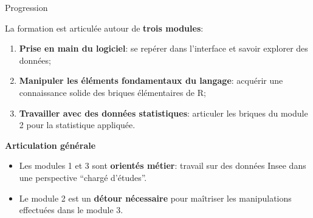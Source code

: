 \documentclass[12pt,ignorenonframetext,]{beamer}
\providecommand{\tightlist}{%
  \setlength{\itemsep}{0pt}\setlength{\parskip}{0pt}}
\newcommand{\strong}[1]{\textbf{\textcolor{redInsee}{#1}}}
\begin{document}
\begin{frame}{Progression}
\protect\hypertarget{progression}{}

La formation est articulée autour de \textbf{trois modules}:

\begin{enumerate}
[1.]
\item
  \pause \textbf{Prise en main du logiciel}: se repérer dans l’interface
  et savoir explorer des données;
\item
  \pause \textbf{Manipuler les éléments fondamentaux du langage}:
  acquérir une connaissance solide des briques élémentaires de R;
\item
  \pause \textbf{Travailler avec des données statistiques}: articuler
  les briques du module 2 pour la statistique appliquée.
\end{enumerate}

\bigskip \pause \strong{Articulation générale}

\begin{itemize}
\tightlist
\item
  \pause Les modules 1 et 3 sont \textbf{orientés métier}: travail sur
  des données Insee dans une perspective \enquote{chargé d’études}.
\item
  \pause Le module 2 est un \textbf{détour nécessaire} pour maîtriser
  les manipulations effectuées dans le module 3.
\end{itemize}

\end{frame}
\end{document}
